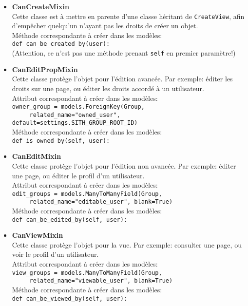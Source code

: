 \documentclass[a4paper]{report}
\begin{document}
\begin{itemize}
    \item \textbf{CanCreateMixin} \\
        Cette classe est à mettre en parente d'une classe héritant de \verb#CreateView#, afin d'empêcher quelqu'un
        n'ayant pas les droits de créer un objet.\\
        Méthode correspondante à créer dans les modèles: \\
        \verb#def can_be_created_by(user):# \\
        (Attention, ce n'est pas une méthode prenant \verb#self# en premier paramètre!)
    \item \textbf{CanEditPropMixin} \\
        Cette classe protège l'objet pour l'édition avancée. Par exemple: éditer les droits sur une page, ou éditer les
        droits accordé à un utilisateur. \\
        Attribut correspondant à créer dans les modèles: \\
        \verb#owner_group = models.ForeignKey(Group, # \\
        \verb#     related_name="owned_user", default=settings.SITH_GROUP_ROOT_ID)# \\
        Méthode correspondante à créer dans les modèles: \\
        \verb#def is_owned_by(self, user):# \\
    \item \textbf{CanEditMixin} \\
        Cette classe protège l'objet pour l'édition non avancée. Par exemple: éditer une page, ou éditer le profil d'un
        utilisateur. \\
        Attribut correspondant à créer dans les modèles: \\
        \verb#edit_groups = models.ManyToManyField(Group, # \\
        \verb#     related_name="editable_user", blank=True)# \\
        Méthode correspondante à créer dans les modèles: \\
        \verb#def can_be_edited_by(self, user):# \\
    \item \textbf{CanViewMixin} \\
        Cette classe protège l'objet pour la vue. Par exemple: consulter une page, ou voir le profil d'un utilisateur. \\
        Attribut correspondant à créer dans les modèles: \\
        \verb#view_groups = models.ManyToManyField(Group, # \\
        \verb#     related_name="viewable_user", blank=True)# \\
        Méthode correspondante à créer dans les modèles: \\
        \verb#def can_be_viewed_by(self, user):# \\
\end{itemize}
\end{document}
